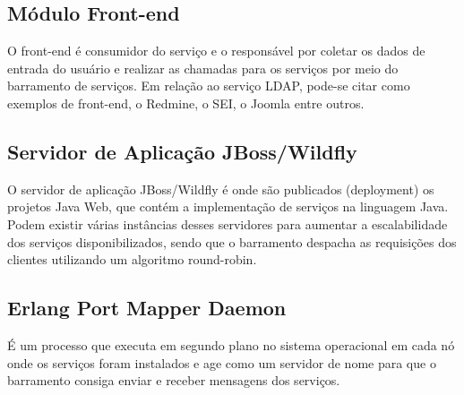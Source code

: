\subsection{Módulo Front-end}

O front-end é consumidor do serviço e o responsável por coletar os dados de entrada do usuário
e realizar as chamadas para os serviços por meio do barramento de serviços.
Em relação ao serviço LDAP, pode-se citar como exemplos de front-end, 
o Redmine, o SEI, o Joomla entre outros.


\subsection{Servidor de Aplicação JBoss/Wildfly}

O servidor de aplicação JBoss/Wildfly é onde são publicados (deployment)
os projetos Java Web, que contém a implementação de serviços na linguagem Java. 
Podem existir várias instâncias desses servidores para
aumentar a escalabilidade dos serviços disponibilizados, 
sendo que o barramento despacha
as requisições dos clientes utilizando um algoritmo round-robin.

\subsection{Erlang Port Mapper Daemon}

É um processo que executa em 
segundo plano no sistema operacional em cada nó onde os serviços foram instalados e age 
como um servidor de nome para que o barramento consiga
enviar e receber mensagens dos serviços.

